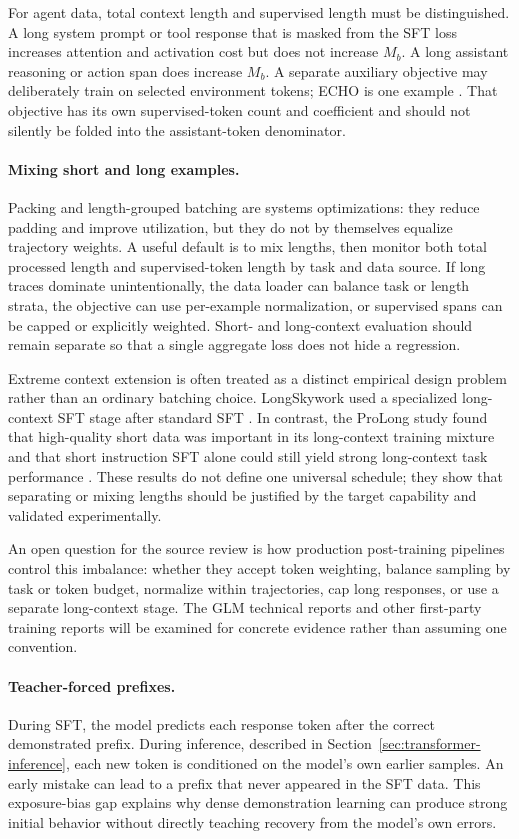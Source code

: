 For agent data, total context length and supervised length must be distinguished. A long
system prompt or tool response that is masked from the SFT loss increases attention and
activation cost but does not increase $M_b$. A long assistant reasoning or action span
does increase $M_b$. A separate auxiliary objective may deliberately train on selected
environment tokens; ECHO is one example \citep{shrivastava2026echo}. That objective has
its own supervised-token count and coefficient and should not silently be folded into the
assistant-token denominator.

\paragraph{Mixing short and long examples.}
Packing and length-grouped batching are systems optimizations: they reduce padding and
improve utilization, but they do not by themselves equalize trajectory weights. A useful
default is to mix lengths, then monitor both total processed length and supervised-token
length by task and data source. If long traces dominate unintentionally, the data loader
can balance task or length strata, the objective can use per-example normalization, or
supervised spans can be capped or explicitly weighted. Short- and long-context evaluation
should remain separate so that a single aggregate loss does not hide a regression.

Extreme context extension is often treated as a distinct empirical design problem rather
than an ordinary batching choice. LongSkywork used a specialized long-context SFT stage
after standard SFT \citep{zhao2024longskywork}. In contrast, the ProLong study found that
high-quality short data was important in its long-context training mixture and that short
instruction SFT alone could still yield strong long-context task performance
\citep{gao2024longcontext}. These results do not define one universal schedule; they show
that separating or mixing lengths should be justified by the target capability and
validated experimentally.

An open question for the source review is how production post-training pipelines control
this imbalance: whether they accept token weighting, balance sampling by task or token
budget, normalize within trajectories, cap long responses, or use a separate long-context
stage. The GLM technical reports and other first-party training reports will be examined
for concrete evidence rather than assuming one convention.

\paragraph{Teacher-forced prefixes.}
During SFT, the model predicts each response token after the correct demonstrated prefix.
During inference, described in Section~\ref{sec:transformer-inference}, each new token is
conditioned on the model's own earlier samples. An early mistake can lead to a prefix that
never appeared in the SFT data. This exposure-bias gap explains why dense demonstration
learning can produce strong initial behavior without directly teaching recovery from the
model's own errors.

